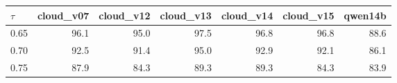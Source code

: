 \begin{tabular}{lrrrrrr}
\hline
$\tau$ & cloud\_v07 & cloud\_v12 & cloud\_v13 & cloud\_v14 & cloud\_v15 & qwen14b \\
\hline
0.65 & 96.1 & 95.0 & 97.5 & 96.8 & 96.8 & 88.6 \\
0.70 & 92.5 & 91.4 & 95.0 & 92.9 & 92.1 & 86.1 \\
0.75 & 87.9 & 84.3 & 89.3 & 89.3 & 84.3 & 83.9 \\
\hline
\end{tabular}
